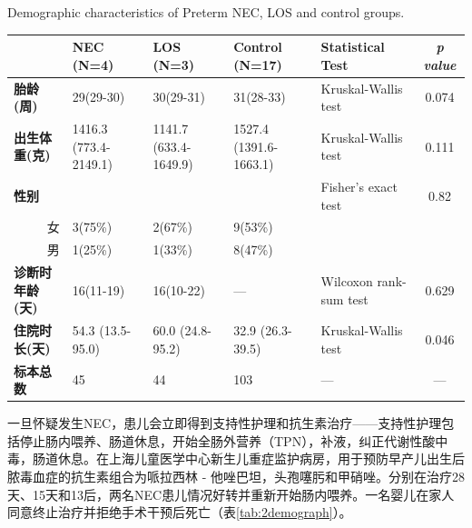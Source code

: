     \begin{table}[!hpb]
      \centering
        {Demographic characteristics of Preterm NEC, LOS and control groups.}
      \label{tab:necdemographic}
      \begin{tabular}{lp{1.8cm}p{1.8cm}p{1.8cm}p{2cm}c}
        \toprule
           & \textbf{NEC (N=4)} & \textbf{LOS (N=3)} & \textbf{Control (N=17)} & \textbf{Statistical Test} & \textit{p value} \\ \midrule
          \textbf{胎龄(周)} & 29(29-30) & 30(29-31) & 31(28-33) & Kruskal-Wallis test & 0.074 \\
          \textbf{出生体重(克)} & 1416.3 (773.4-2149.1) & 1141.7 (633.4-1649.9) & 1527.4 (1391.6-1663.1) & Kruskal-Wallis test & 0.111 \\
          \textbf{性别} &  &  &  & Fisher's exact test & 0.82 \\
          \multicolumn{1}{r}{女} & 3(75\%) & 2(67\%) & 9(53\%) &  & \\
          \multicolumn{1}{r}{男} & 1(25\%) & 1(33\%) & 8(47\%) &  & \\
          \textbf{诊断时年龄(天)} & 16(11-19) & 16(10-22) & — & Wilcoxon rank-sum test & 0.629 \\
          \textbf{住院时长(天)} & 54.3 (13.5-95.0) & 60.0 (24.8-95.2) & 32.9 (26.3-39.5) & Kruskal-Wallis test & 0.046 \\
          \textbf{标本总数} & 45 & 44 & 103 & — & — \\ \bottomrule
      \end{tabular}
    \end{table}


    一旦怀疑发生NEC，患儿会立即得到支持性护理和抗生素治疗——支持性护理包括停止肠内喂养、肠道休息，开始全肠外营养（TPN），补液，纠正代谢性酸中毒，肠道休息。在上海儿童医学中心新生儿重症监护病房，用于预防早产儿出生后脓毒血症的抗生素组合为哌拉西林 - 他唑巴坦，头孢噻肟和甲硝唑。分别在治疗28天、15天和13后，两名NEC患儿情况好转并重新开始肠内喂养。一名婴儿在家人同意终止治疗并拒绝手术干预后死亡（表\ref{tab:2demograph}）。

